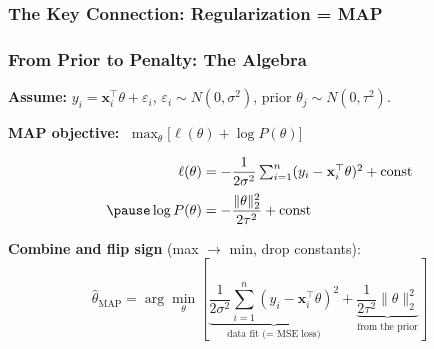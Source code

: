 \documentclass[aspectratio=169]{beamer}
\begin{document}
\begin{frame}
\frametitle{The Key Connection: Regularization = MAP}
\begin{center}
\end{center}
\end{frame}

\begin{frame}
\frametitle{From Prior to Penalty: The Algebra}

\small
\textbf{Assume:} $y_i = \mathbf{x}_i^\top\theta + \varepsilon_i$, \; $\varepsilon_i \sim N(0, \sigma^2)$, \; prior $\theta_j \sim N(0, \tau^2)$.

\pause
\vspace{0.05cm}
\textbf{MAP objective:} $\;\max_\theta \bigl[\ell(\theta) + \log P(\theta)\bigr]$

\pause
\vspace{-0.05cm}
\begin{align*}
\ell(\theta) &= -\frac{1}{2\sigma^2}\textstyle\sum_{i=1}^n(y_i - \mathbf{x}_i^\top\theta)^2 + \text{const}\\[2pt]
\pause
\log P(\theta) &= -\frac{\|\theta\|_2^2}{2\tau^2} + \text{const}
\end{align*}

\vspace{-0.2cm}
\pause
\textbf{Combine and flip sign} (max $\to$ min, drop constants):
\vspace{-0.1cm}
$$\hat{\theta}_{\text{MAP}} = \arg\min_\theta \left[\underbrace{\frac{1}{2\sigma^2}\sum_{i=1}^n(y_i - \mathbf{x}_i^\top\theta)^2}_{\text{data fit (= MSE loss)}} + \underbrace{\frac{1}{2\tau^2}\|\theta\|_2^2}_{\text{from the prior}}\right]$$

\vspace{-0.2cm}
\pause
\begin{center}
\end{center}
\end{frame}
\end{document}
